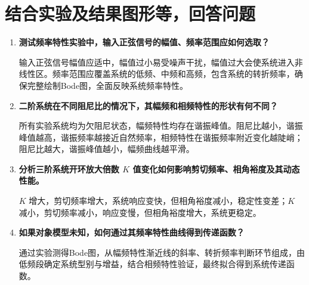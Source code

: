 \documentclass[12pt,a4paper]{article}
\begin{document}
\section{结合实验及结果图形等，回答问题}
\begin{enumerate}[label=\textbf{\arabic*.}, leftmargin=2.5em, itemsep=1em]
\item \textbf{测试频率特性实验中，输入正弦信号的幅值、频率范围应如何选取？}

输入正弦信号幅值应适中，幅值过小易受噪声干扰，幅值过大会使系统进入非线性区。频率范围应覆盖系统的低频、中频和高频，包含系统的转折频率，确保完整绘制Bode图，全面反映系统频率特性。

\item \textbf{二阶系统在不同阻尼比的情况下，其幅频和相频特性的形状有何不同？}

所有实验系统均为欠阻尼状态，幅频特性均存在谐振峰值。阻尼比越小，谐振峰值越高，谐振频率越接近自然频率，相频特性在谐振频率附近变化越陡峭；阻尼比越大，谐振峰值越小，幅频曲线越平滑。

\item \textbf{分析三阶系统开环放大倍数 $K$ 值变化如何影响剪切频率、相角裕度及其动态性能。}

$K$ 增大，剪切频率增大，系统响应变快，但相角裕度减小，稳定性变差；$K$ 减小，剪切频率减小，响应变慢，但相角裕度增大，系统更稳定。

\item \textbf{如果对象模型未知，如何通过其频率特性曲线得到传递函数？}

通过实验测得Bode图，从幅频特性渐近线的斜率、转折频率判断环节组成，由低频段确定系统型别与增益，结合相频特性验证，最终拟合得到系统传递函数。
\end{enumerate}
\end{document}
